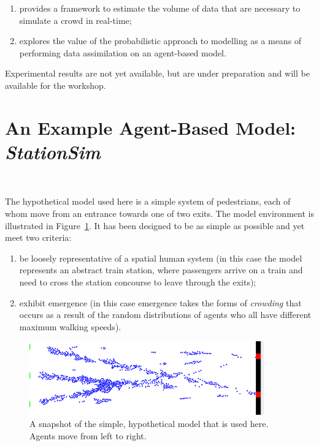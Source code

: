 \documentclass[runningheads]{llncs}
\begin{document}
\begin{enumerate}
	\item provides a framework to estimate the volume of data that are necessary to simulate a crowd in real-time;
	\item explores the value of the probabilistic approach to modelling as a means of performing data assimilation on an agent-based model.
\end{enumerate}

Experimental results are not yet available, but are under preparation and will be available for the workshop.



%
%
%
%
\section{An Example Agent-Based Model: \textit{StationSim}}

$ $ %

The hypothetical model used here is a simple system of pedestrians, each of whom move from an entrance towards one of two exits. The model environment is illustrated in Figure~\ref{fig:pedestrian_model_environment}. It has been designed to be as simple as possible and yet meet two criteria:

\begin{enumerate}
	\item be loosely representative of a spatial human system (in this case the model represents an abstract train station, where passengers arrive on a train and need to cross the station concourse to leave through the exits);
	\item exhibit emergence (in this case emergence takes the forms of \textit{crowding} that occurs as a result of the random distributions of agents who all have different maximum walking speeds).
\end{enumerate}

\begin{figure}
	\centering
	\includegraphics[width=0.9\textwidth]{figures/pedestrian_model_environment2}
	\caption{A snapshot of the simple, hypothetical model that is used here. Agents move from left to right.} \label{fig:pedestrian_model_environment}
\end{figure}
\end{document}
